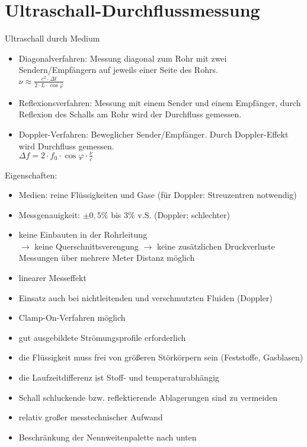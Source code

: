\section{Ultraschall-Durchflussmessung}
Ultraschall durch Medium
\begin{itemize}
\item Diagonalverfahren: Messung diagonal zum Rohr mit zwei Sendern/Empfängern auf jeweils einer Seite des Rohrs.\\
 $\nu \approx \frac{c^2 \cdot \Delta t}{2 \cdot L \cdot \cos \varphi}$
\item Reflexionsverfahren: Messung mit einem Sender und einem Empfänger, durch Reflexion des Schalls am Rohr wird der Durchfluss gemessen.
\item Doppler-Verfahren: Beweglicher Sender/Empfänger. Durch Doppler-Effekt wird Durchfluss gemessen.\\
$\Delta f = 2 \cdot f_0 \cdot \cos \varphi \cdot \frac{\nu}{c}$
\end{itemize}
Eigenschaften:
\begin{itemize}
\item Medien: reine Flüssigkeiten und Gase (für Doppler: Streuzentren notwendig)
\item Messgenauigkeit: $\pm 0,5\%$ bis $3 \%$ v.S. (Doppler: schlechter)
\end{itemize}
\begin{itemize}[label=$+$]
\item keine Einbauten in der Rohrleitung\\
$\to$ keine Querschnittsverengung $\to$ keine zusätzlichen Druckverluste\\
Messungen über mehrere Meter Distanz möglich
\item linearer Messeffekt
\item Einsatz auch bei nichtleitenden und verschmutzten Fluiden (Doppler)
\item Clamp-On-Verfahren möglich
\end{itemize}
\begin{itemize}[label=$-$]
\item gut ausgebildete Strömungsprofile erforderlich
\item die Flüssigkeit muss frei von größeren Störkörpern sein (Feststoffe, Gasblasen)
\item die Laufzeitdifferenz ist Stoff- und temperaturabhängig
\item Schall schluckende bzw. reflektierende Ablagerungen sind zu vermeiden
\item relativ großer messtechnischer Aufwand
\item Beschränkung der Nennweitenpalette nach unten
\end{itemize}

